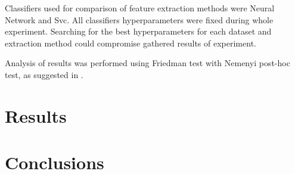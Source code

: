 \documentclass[a4paper, 10 pt, conference]{ieeeconf}
\begin{document}
Classifiers used for comparison of feature extraction methods were Neural Network and Svc. All classifiers hyperparameters were fixed during whole experiment. Searching for the best hyperparameters for each dataset and extraction method could compromise gathered results of experiment.

Analysis of results was performed using Friedman test with Nemenyi post-hoc test, as suggested in \cite{demsar}.

\section{Results}

\section{Conclusions}




\end{document}
